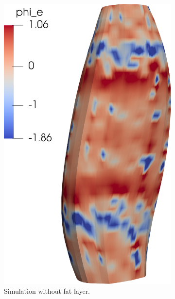 \begin{figure}[H]
  \centering%
  \begin{subfigure}[t]{0.36\textwidth}%
    \centering%
    \includegraphics[width=\textwidth]{images/results/application/fibers_emg_no_fat.png}%
    \caption{Simulation without fat layer.}%
    \label{fig:fibers_emg_no_fat}%
  \end{subfigure} \quad
  \begin{subfigure}[t]{0.25\textwidth}%
    \centering%

\end{subfigure}
\end{figure}
